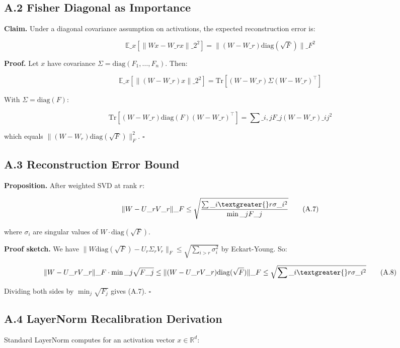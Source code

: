 \subsection{A.2 Fisher Diagonal as Importance}

\textbf{Claim.} Under a diagonal covariance assumption on activations, the 
expected reconstruction error is:

\[
\mathbb{E}\_x\!\left[\|W x - W\_r x\|\_2^2\right] = \|(W - W\_r) \mathrm{diag}(\sqrt{F})\|\_F^2
\tag{A.4}
\]

\textbf{Proof.} Let $x$ have covariance $\Sigma = \mathrm{diag}(F_1, \dots, F_n)$. Then:

\[
\mathbb{E}\_x[\|(W - W\_r) x\|\_2^2] = \mathrm{Tr}[(W - W\_r) \Sigma (W - W\_r)^\top]
\tag{A.5}
\]

With $\Sigma = \mathrm{diag}(F)$:

\[
\mathrm{Tr}[(W - W\_r) \mathrm{diag}(F) (W - W\_r)^\top] = \sum\_{i, j} F\_j (W - W\_r)\_{ij}^2
\tag{A.6}
\]

which equals $\|(W - W_r) \mathrm{diag}(\sqrt{F})\|_F^2$. $\square$

\subsection{A.3 Reconstruction Error Bound}

\textbf{Proposition.} After weighted SVD at rank $r$:

\[
\|W - U\_r V\_r\|\_F \leq \sqrt{\frac{\sum\_{i \textgreater{} r} \sigma\_i^2}{\min\_j F\_j}}
\tag{A.7}
\]

where $\sigma_i$ are singular values of $W \cdot \mathrm{diag}(\sqrt{F})$.

\textbf{Proof sketch.} We have $\|W \mathrm{diag}(\sqrt{F}) - U_r \Sigma_r V_r\|_F \leq \sqrt{\sum_{i > r} \sigma_i^2}$ by Eckart-Young. So:

\[
\|W - U\_r V\_r\|\_F \cdot \min\_j \sqrt{F\_j} \leq \|(W - U\_r V\_r) \mathrm{diag}(\sqrt{F})\|\_F \leq \sqrt{\sum\_{i \textgreater{} r} \sigma\_i^2}
\tag{A.8}
\]

Dividing both sides by $\min_j \sqrt{F_j}$ gives (A.7). $\square$

\subsection{A.4 LayerNorm Recalibration Derivation}

Standard LayerNorm computes for an activation vector $x \in \mathbb{R}^d$:

